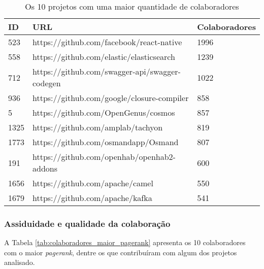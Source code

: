 \begin{table}[H]
\centering
\begin{tabular}{|l|l|l|}
\hline
\textbf{ID} & \textbf{URL}                                   & \textbf{Colaboradores} \\ \hline
523         & https://github.com/facebook/react-native       & 1996                   \\ \hline
558         & https://github.com/elastic/elasticsearch       & 1239                   \\ \hline
712         & https://github.com/swagger-api/swagger-codegen & 1022                   \\ \hline
936         & https://github.com/google/closure-compiler     & 858                    \\ \hline
5           & https://github.com/OpenGenus/cosmos            & 857                    \\ \hline
1325        & https://github.com/amplab/tachyon              & 819                    \\ \hline
1773        & https://github.com/osmandapp/Osmand            & 807                    \\ \hline
191         & https://github.com/openhab/openhab2-addons     & 600                    \\ \hline
1656        & https://github.com/apache/camel                & 550                    \\ \hline
1679        & https://github.com/apache/kafka                & 541                    \\ \hline
\end{tabular}
\caption{Os 10 projetos com uma maior quantidade de colaboradores}
\label{tab:projetos_mais_colaboradores}
\end{table}

\subsubsection{Assiduidade e qualidade da colaboração}

 A Tabela \ref{tab:colaboradores_maior_pagerank} apresenta os 10 colaboradores com o maior \textit{pagerank}, dentre os que contribuíram com algum dos projetos analisado.

